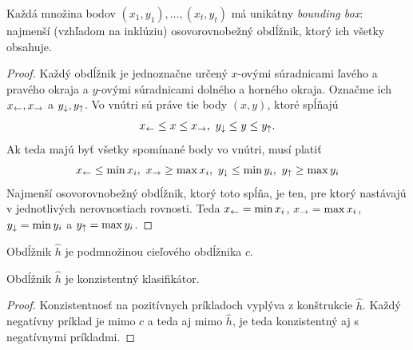 \begin{lemma}
  Každá množina bodov $(x_1, y_1), \ldots, (x_t, y_t)$ má unikátny
  \emph{bounding box}: najmenší (vzhľadom na inklúziu) osovorovnobežný
  obdĺžnik, ktorý ich všetky obsahuje.
\end{lemma}
\begin{proof}
  Každý obdĺžnik je jednoznačne určený $x$-ovými súradnicami ľavého
  a pravého okraja a $y$-ovými súradnicami dolného a horného okraja.
  Označme ich $x_\leftarrow, x_\rightarrow$ a $y_\downarrow, y_\uparrow$.
  Vo vnútri sú práve tie body $(x, y)$, ktoré spĺňajú
  $$x_\larr \leq x \leq x_\rarr,\ y_\darr \leq y \leq y_\uarr.$$
  Ak teda majú byť všetky spomínané body vo vnútri, musí platiť
  $$
    x_\larr \leq \min x_i,\ 
    x_\rarr \geq \max x_i,\ 
    y_\darr \leq \min y_i,\ 
    y_\uarr \geq \max y_i
  $$
  Najmenší osovorovnobežný obdĺžnik, ktorý toto spĺňa, je ten, pre
  ktorý nastávajú v jednotlivých nerovnostiach rovnosti. Teda
  $x_\leftarrow = \min x_i$, $x_\rightarrow = \max x_i$, $y_\downarrow = \min y_i$ a $y_\uparrow = \max y_i$.
\end{proof}
\begin{corollary}
  Obdĺžnik $\hat{h}$ je podmnožinou cieľového obdĺžnika $c$.
\end{corollary}
\begin{corollary}
  Obdĺžnik $\hat{h}$ je konzistentný klasifikátor.
\end{corollary}
\begin{proof}
  Konzistentnosť na pozitívnych príkladoch vyplýva z konštrukcie $\hat{h}$.
  Každý negatívny príklad je mimo $c$ a teda aj mimo $\hat{h}$, je teda
  konzistentný aj s negatívnymi príkladmi.
\end{proof}

